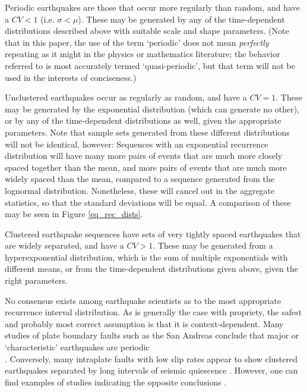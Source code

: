 \documentclass[se, manuscript]{copernicus}
\begin{document}
Periodic earthquakes are those that occur more regularly than random,
and have a \(CV < 1\) (i.e. \(\sigma < \mu\)). These may be generated
by any of the time-dependent distributions described above with suitable
scale and shape parameters. (Note that in this paper, the use of the
term `periodic' does not mean \emph{perfectly} repeating as it might in
the physics or mathematics literature; the behavior referred to is most 
accurately termed `quasi-periodic', but that term will not be used in the 
interests of conciseness.)

Unclustered earthquakes occur as regularly as random, and have a
\(CV=1\). These may be generated by the exponential distribution (which
can generate no other), or by any of the time-dependent distributions as
well, given the appropriate parameters. Note that sample sets generated
from these different distributions will not be identical, however:
Sequences with an exponential recurrence distribution will have many
more pairs of events that are much more closely spaced together than the
mean, and more pairs of events that are much more widely spaced than the
mean, compared to a sequence generated from the lognormal distribution.
Nonetheless, these will cancel out in the aggregate statistics, so that
the standard deviations will be equal. A comparison of these may be seen
in Figure \ref{eq_rec_dists}.

Clustered earthquake sequences have sets of very tightly spaced
earthquakes that are widely separated, and have a \(CV>1\). These may
be generated from a hyperexponential distribution, which is the sum of
multiple exponentials with different means, or from the time-dependent
distributions given above, given the right parameters.

No consensus exists among earthquake scientists as to the most
appropriate recurrence interval distribution. As is generally the case
with propriety, the safest and probably most correct assumption is that
it is context-dependent. Many studies of plate boundary faults such as
the San Andreas conclude that major or `characteristic' earthquakes are
periodic\\
\citep[e.g.,][]{berryman_major_2012,scharer_quasi-periodic_2010}.
Conversely, many intraplate faults with low slip rates appear to show
clustered earthquakes separated by long intervals of seismic quiescence
\citep[e.g.,][]{clark_long-term_2012}. However, one can find examples of
studies indicating the opposite conclusions
\citep{tuttle_earthquake_2002,grant_paleoseismic_1994}.
\end{document}
